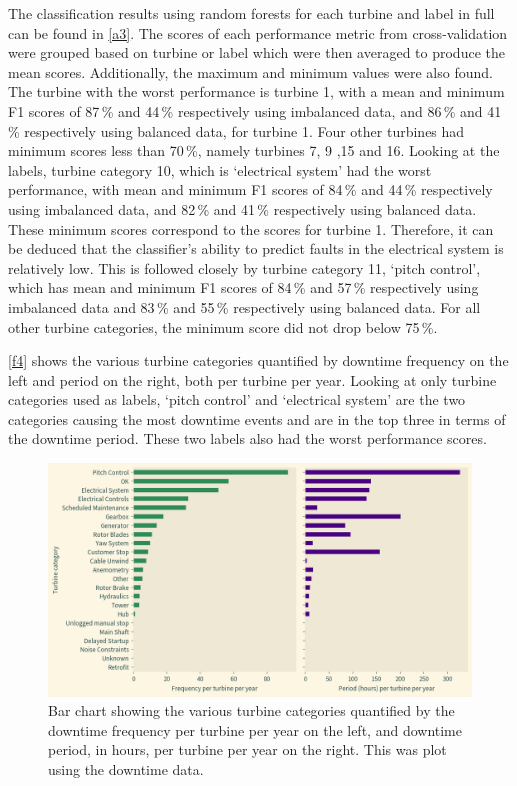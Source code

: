 The classification results using random forests for each turbine and label in full can be found in \autoref{a3}. The scores of each performance metric from cross-validation were grouped based on turbine or label which were then averaged to produce the mean scores. Additionally, the maximum and minimum values were also found. The turbine with the worst performance is turbine 1, with a mean and minimum F1 scores of 87\,\% and 44\,\% respectively using imbalanced data, and 86\,\% and 41\,\% respectively using balanced data, for turbine 1. Four other turbines had minimum scores less than 70\,\%, namely turbines 7, 9 ,15 and 16. Looking at the labels, turbine category 10, which is `electrical system' had the worst performance, with mean and minimum F1 scores of 84\,\% and 44\,\% respectively using imbalanced data, and 82\,\% and 41\,\% respectively using balanced data. These minimum scores correspond to the scores for turbine 1. Therefore, it can be deduced that the classifier's ability to predict faults in the electrical system is relatively low. This is followed closely by turbine category 11, `pitch control', which has mean and minimum F1 scores of 84\,\% and 57\,\% respectively using imbalanced data and 83\,\% and 55\,\% respectively using balanced data. For all other turbine categories, the minimum score did not drop below 75\,\%.

\autoref{f4} shows the various turbine categories quantified by downtime frequency on the left and period on the right, both per turbine per year. Looking at only turbine categories used as labels, `pitch control' and `electrical system' are the two categories causing the most downtime events and are in the top three in terms of the downtime period. These two labels also had the worst performance scores.

\begin{figure}
  \centering
  \includegraphics[width=\textwidth]{../images/f4}
  \caption{\label{f4}Bar chart showing the various turbine categories quantified by the downtime frequency per turbine per year on the left, and downtime period, in hours, per turbine per year on the right. This was plot using the downtime data.}
\end{figure}

